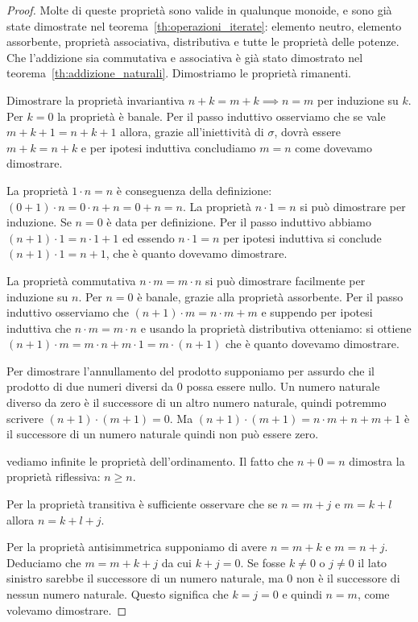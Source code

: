 \begin{proof}
Molte di queste proprietà sono valide in qualunque monoide, e sono già 
state dimostrate nel teorema~\ref{th:operazioni_iterate}:
elemento neutro, elemento assorbente, proprietà associativa, 
distributiva e tutte le proprietà delle potenze.
Che l'addizione sia commutativa e associativa è già stato dimostrato 
nel teorema~\ref{th:addizione_naturali}.
Dimostriamo le proprietà rimanenti.

Dimostrare la proprietà invariantiva $n+k=m+k \implies n=m$ 
per induzione su $k$.
Per $k=0$ la proprietà è banale.  
Per il passo induttivo osserviamo che se vale $m+k+1=n+k+1$
allora, grazie all'iniettività di $\sigma$, 
dovrà essere $m+k = n+k$
e per ipotesi induttiva concludiamo $m=n$ come dovevamo dimostrare.
  
La proprietà $1\cdot n=n$ è conseguenza 
della definizione: $(0+1)\cdot n = 0\cdot n + n = 0 + n = n$. 
La proprietà $n\cdot 1=n$ si può dimostrare per induzione.
Se $n=0$ è data per definizione. 
Per il passo induttivo abbiamo $(n+1)\cdot 1 = n\cdot 1 + 1$
ed essendo $n\cdot 1=n$ per ipotesi induttiva 
si conclude $(n+1)\cdot 1 = n+1$, che è quanto dovevamo dimostrare.

La proprietà commutativa $n\cdot m=m\cdot n$ si può dimostrare 
facilmente per induzione su $n$. 
Per $n=0$ è banale, grazie alla proprietà assorbente.
Per il passo induttivo osserviamo che $(n+1)\cdot m = n\cdot m + m$
e suppendo per ipotesi induttiva che $n\cdot m=m\cdot n$ 
e usando la proprietà distributiva otteniamo:
si ottiene $(n+1)\cdot m = m\cdot n + m\cdot 1 = m\cdot (n+1)$
che è quanto dovevamo dimostrare.

Per dimostrare l'annullamento del prodotto supponiamo per assurdo che 
il prodotto di due numeri diversi da $0$ possa essere nullo.
Un numero naturale diverso da zero è il successore di un altro numero naturale, 
quindi potremmo scrivere $(n+1)\cdot(m+1)=0$. 
Ma $(n+1)\cdot(m+1) = n\cdot m + n + m + 1$ è il successore di un numero naturale  
quindi non può essere zero.

vediamo infinite le proprietà dell'ordinamento.
Il fatto che $n+0=n$ dimostra la proprietà riflessiva: $n\ge n$.
  
Per la proprietà transitiva è sufficiente osservare
che se $n=m+j$ e $m=k+l$ allora $n=k+l+j$.

Per la proprietà antisimmetrica supponiamo di avere $n=m+k$ 
e $m=n+j$. 
Deduciamo che $ m = m+k+j$ da cui $k+j=0$.
Se fosse $k\neq 0$ o $j\neq 0$ il lato sinistro sarebbe il successore 
di un numero naturale, ma $0$ non è il successore di nessun numero naturale.
Questo significa che $k=j=0$ e quindi $n=m$, come volevamo dimostrare.


\end{proof}
